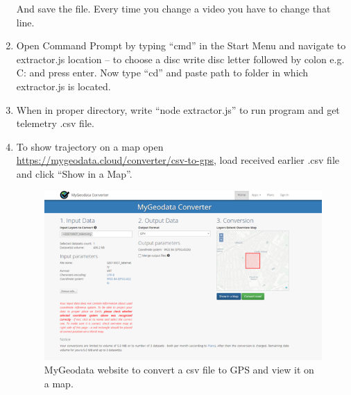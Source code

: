 \documentclass[a4paper,12pt]{article}
\begin{document}
\begin{enumerate}
	And save the file. Every time you change a video you have to change that line.
	\item Open Command Prompt by typing “cmd” in the Start Menu and navigate to extractor.js location – to choose a disc write disc letter followed by colon e.g. C: and press enter. Now type “cd” and paste path to folder in which extractor.js is located.
	\item When in proper directory, write “node extractor.js” to run program and get telemetry .csv file.
	\pagebreak
	\item To show trajectory on a map open \\ 
	\url{https://mygeodata.cloud/converter/csv-to-gps}, load received earlier .csv file and click “Show in a Map”.
	\begin{figure}[H]
		\centering
		\includegraphics{Map_page}
		\caption{MyGeodata website to convert a csv file to GPS and view it on a map.}
	\end{figure}
\end{enumerate}
 
\end{document}
